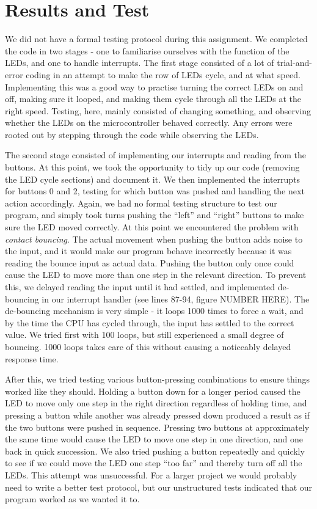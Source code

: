 \section{Results and Test}
We did not have a formal testing protocol during this assignment. We completed the code in two stages - one to familiarise ourselves with the function of the LEDs, and one to handle interrupts. The first stage consisted of a lot of trial-and-error coding in an attempt to make the row of LEDs cycle, and at what speed. Implementing this was a good way to practise turning the correct LEDs on and off, making sure it looped, and making them cycle through all the LEDs at the right speed. Testing, here, mainly consisted of changing something, and observing whether the LEDs on the microcontroller behaved correctly. Any errors were rooted out by stepping through the code while observing the LEDs.

The second stage consisted of implementing our interrupts and reading from the buttons. At this point, we took the opportunity to tidy up our code (removing the LED cycle sections) and document it. We then implemented the interrupts for buttons 0 and 2, testing for which button was pushed and handling the next action accordingly. Again, we had no formal testing structure to test our program, and simply took turns pushing the ``left'' and ``right'' buttons to make sure the LED moved correctly. At this point we encountered the problem with {\em contact bouncing}. The actual movement when pushing the button adds noise to the input, and it would make our program behave incorrectly because it was reading the bounce input as actual data. Pushing the button only once could cause the LED to move more than one step in the relevant direction. To prevent this, we delayed reading the input until it had settled, and implemented de-bouncing in our interrupt handler (see lines 87-94, figure NUMBER HERE). The de-bouncing mechanism is very simple - it loops 1000 times to force a wait, and by the time the CPU has cycled through, the input has settled to the correct value. We tried first with 100 loops, but still experienced a small degree of bouncing. 1000 loops takes care of this without causing a noticeably delayed response time.

After this, we tried testing various button-pressing combinations to ensure things worked like they should. Holding a button down for a longer period caused the LED to move only one step in the right direction regardless of holding time, and pressing a button while another was already pressed down produced a result as if the two buttons were pushed in sequence. Pressing two buttons at approximately the same time would cause the LED to move one step in one direction, and one back in quick succession. We also tried pushing a button repeatedly and quickly to see if we could move the LED one step ``too far'' and thereby turn off all the LEDs. This attempt was unsuccessful. For a larger project we would probably need to write a better test protocol, but our unstructured tests indicated that our program worked as we wanted it to.